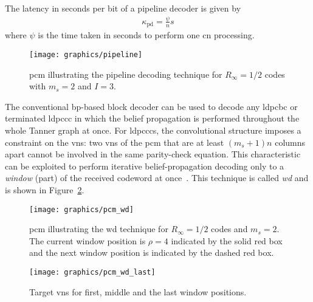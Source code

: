 The latency in seconds per bit of a pipeline decoder is given by
\begin{align}
\kappa_{\text{pd}}=\frac{\psi}{n}s
\end{align}
where $\psi$ is the time taken in seconds to perform one \ac{cn} processing.

\begin{figure}[htbp]
  \centering
  \texttt{[image: graphics/pipeline]}
  \caption{\ac{pcm} illustrating the pipeline decoding technique for $R_\infty=1/2$ codes with $m_s=2$ and $I=3$.}
  \label{fig:pipeline}
\end{figure}

The conventional \ac{bp}-based block decoder can be used to decode any \ac{ldpcbc} or terminated \ac{ldpccc} in which the belief propagation is performed throughout the whole Tanner graph at once. For \acp{ldpccc}, the convolutional structure imposes a constraint on the \acp{vn}: two \acp{vn} of the \ac{pcm} that are at least $(m_s+1)n$ columns apart cannot be involved in the same parity-check equation. This characteristic can be exploited to perform iterative belief-propagation decoding only to a \emph{window} (part) of the received codeword at once~\cite{Iyengar2012}. This technique is called \emph{\ac{wd}} and is shown in Figure~\ref{fig:wd}.
\begin{figure}[htbp]
  \centering
  \texttt{[image: graphics/pcm\_wd]}
  \caption{\ac{pcm} illustrating the \acl{wd} technique for $R_\infty=1/2$ codes and $m_s=2$. The current window position is $\rho=4$ indicated by the solid red box and the next window position is indicated by the dashed red box.}
  \label{fig:wd}
\end{figure}

\begin{figure}[htbp]
  \centering
  \texttt{[image: graphics/pcm\_wd\_last]}
  \caption{Target \acp{vn} for first, middle and the last window positions.}
  \label{fig:wd_last}
\end{figure}

